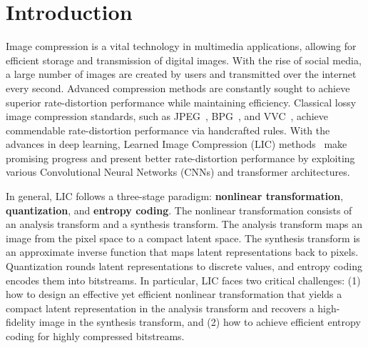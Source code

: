 \section{Introduction}


Image compression is a vital technology in multimedia applications, allowing for efficient storage and transmission of digital images. 
With the rise of social media, a large number of images are created by users and transmitted over the internet every second. 
Advanced compression methods are constantly sought to achieve superior rate-distortion performance while maintaining efficiency.
Classical lossy image compression standards, such as JPEG~\cite{wallace1991jpeg}, BPG~\cite{bellard2018bpg}, and VVC~\cite{bross2020versatile}, achieve commendable rate-distortion performance via handcrafted rules. 
With the advances in deep learning, Learned Image Compression (LIC) methods~\cite{balle2017end, song2021variable, cui2021asymmetric, ma2022end, ali2023towards, theis2022lossy, mentzer2018conditional, li2020efficient, son2021enhanced, dardouri2021dynamic} make promising progress and present better rate-distortion performance by exploiting various Convolutional Neural Networks (CNNs) and transformer architectures.


In general, LIC follows a three-stage paradigm: \textbf{nonlinear transformation}, \textbf{quantization}, and \textbf{entropy coding}.
The nonlinear transformation consists of an analysis transform and a synthesis transform.
The analysis transform maps an image from the pixel space to a compact latent space. 
The synthesis transform is an approximate inverse function that maps latent representations back to pixels.
Quantization rounds latent representations to discrete values, and entropy coding encodes them into bitstreams.
In particular, LIC faces two critical challenges: 
(1) how to design an effective yet efficient nonlinear transformation that yields a compact latent representation in the analysis transform and recovers a high-fidelity image in the synthesis transform, and
(2) how to achieve efficient entropy coding for highly compressed bitstreams.


